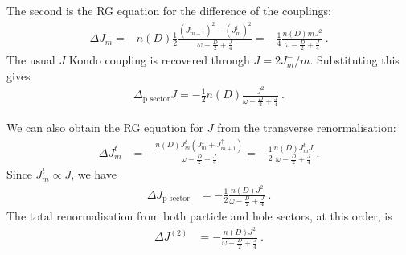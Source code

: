 \documentclass[reprint,onecolumn,prb,superscriptaddress]{revtex4-2}
\begin{document}
The second is the RG equation for the difference of the couplings:
\begin{equation}\begin{aligned}
	\Delta J^-_m = -n(D)\frac{1}{2}\frac{\left( J^t_{m-1} \right) ^2 - \left(J^t_{m}\right) ^2}{\omega - \frac{D}{2} + \frac{J}{4}} = -\frac{1}{4}\frac{n(D) m J^2}{\omega - \frac{D}{2} + \frac{J}{4}}~.
\end{aligned}\end{equation}
The usual \(J\) Kondo coupling is recovered through \(J = 2J^-_m/m\). Substituting this gives 
\begin{equation}\begin{aligned}
	\Delta_\text{p sector} J = -\frac{1}{2}n(D)\frac{J^2}{\omega - \frac{D}{2} + \frac{J}{4}}~.
\end{aligned}\end{equation}

We can also obtain the RG equation for \(J\) from the transverse renormalisation:
\begin{equation}\begin{aligned}
	\Delta J^t_m &= - \frac{n(D)J^t_m \left( J^\downarrow_m + J^\uparrow_{m+1} \right) }{\omega - \frac{D}{2} + \frac{J}{4}} = -\frac{1}{2}\frac{n(D)J^t_m J}{\omega - \frac{D}{2} + \frac{J}{4}}~.
\end{aligned}\end{equation}
Since \(J^t_m \propto J\), we have
\begin{equation}\begin{aligned}
	\Delta J_\text{p sector} &= -\frac{1}{2}\frac{n(D)J^2}{\omega - \frac{D}{2} + \frac{J}{4}}~.
\end{aligned}\end{equation}
The total renormalisation from both particle and hole sectors, at this order, is
\begin{equation}\begin{aligned}
	\Delta J^{(2)} &= -\frac{n(D)J^2}{\omega - \frac{D}{2} + \frac{J}{4}}~.
\end{aligned}\end{equation}
\end{document}
